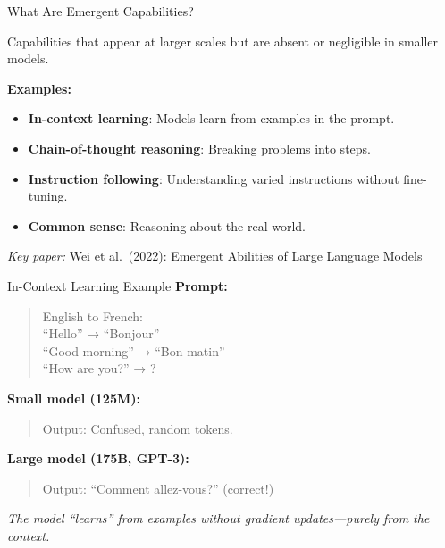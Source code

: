 \documentclass[aspectratio=169,10pt]{beamer}
\begin{document}

\begin{frame}{What Are Emergent Capabilities?}
  \begin{tcolorbox}[alertbox, title=Emergence]
    Capabilities that appear at larger scales but are absent or negligible in smaller models.
  \end{tcolorbox}

  \vspace{0.4cm}

  \textbf{Examples:}
  \begin{itemize}
    \item \textbf{In-context learning}: Models learn from examples in the prompt.
    \item \textbf{Chain-of-thought reasoning}: Breaking problems into steps.
    \item \textbf{Instruction following}: Understanding varied instructions without fine-tuning.
    \item \textbf{Common sense}: Reasoning about the real world.
  \end{itemize}

  \vspace{0.3cm}

  \textit{Key paper:} Wei et al.\ (2022): Emergent Abilities of Large Language Models
\end{frame}

\begin{frame}{In-Context Learning Example}
  \textbf{Prompt:}
  \begin{quote}
    \small
    English to French:\\
    ``Hello'' → ``Bonjour''\\
    ``Good morning'' → ``Bon matin''\\
    ``How are you?'' → ?
  \end{quote}

  \vspace{0.3cm}

  \textbf{Small model (125M):}
  \begin{quote}
    \small
    Output: Confused, random tokens.
  \end{quote}

  \vspace{0.2cm}

  \textbf{Large model (175B, GPT-3):}
  \begin{quote}
    \small
    Output: ``Comment allez-vous?'' (correct!)
  \end{quote}

  \vspace{0.3cm}

  \textit{The model ``learns'' from examples without gradient updates—purely from the context.}
\end{frame}
\end{document}
